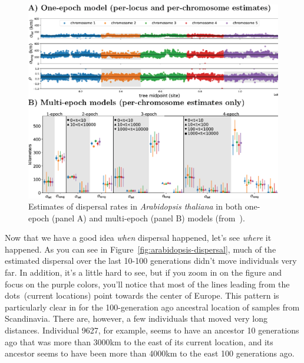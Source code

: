 \documentclass[12pt]{article}
\begin{document}
\begin{figure}
  \begin{center}
    \includegraphics[width=14cm]{arabidopsis-epochs.eps}
  \end{center}
  \caption{Estimates of dispersal rates in {\it Arabidopsis
      thaliana\/} in both one-epoch (panel A) and multi-epoch (panel
    B) models (from~\cite{Osmond-Coop-2021}).}\label{fig:arabidopsis-epochs}
\end{figure}

Now that we have a good idea {\it when\/} dispersal happened, let's
see {\it where\/} it happened. As you can see in
Figure~\ref{fig:arabidopsis-dispersal}, much of the estimated
dispersal over the last 10-100 generations didn't move individuals
very far. In addition, it's a little hard to see, but if you zoom in
on the figure and focus on the purple colors, you'll notice that most
of the lines leading from the dots~(current locations) point towards
the center of Europe. This pattern is particularly clear in for the
100-generation ago ancestral location of samples from
Scandinavia. There are, however, a few individuals that moved very
long distances. Individual 9627, for example, seems to have an ancestor 10
generations ago that was more than 3000km to the east of its current
location, and its ancestor seems to have been more than 4000km to the
east 100 generations ago.
\end{document}
